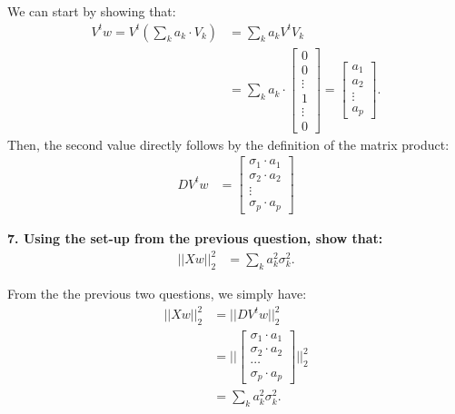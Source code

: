\documentclass[12pt,hidelinks]{article}
\numberwithin{equation}{section}
\begin{document}
\vspace*{12pt}

We can start by showing that:
\begin{align}
V^t w = V^t (\sum_k a_k \cdot V_k) &= \sum_k a_k V^t V_k \\
&= \sum_k a_k \cdot \begin{bmatrix} 0 \\ 0 \\ \vdots \\ 1 \\ \vdots \\ 0 \end{bmatrix}
= \begin{bmatrix} a_1 \\ a_2 \\ \vdots \\ a_p \end{bmatrix}.
\end{align}
Then, the second value directly follows by the definition of the matrix product:
\begin{align}
D V^t w &= \begin{bmatrix} \sigma_1 \cdot a_1 \\ \sigma_2 \cdot a_2 \\ \vdots \\ \sigma_p \cdot a_p \end{bmatrix}
\end{align}

\textbf{7. Using the set-up from the previous question, show that:}
\begin{align}
|| X w ||_2^2 &= \sum_k a_k^2 \sigma_k^2.
\end{align}

\vspace*{12pt}

From the the previous two questions, we simply have:
\begin{align}
|| X w ||_2^2 &= || D V^t w ||_2^2 \\
&= || \begin{bmatrix} \sigma_1 \cdot a_1 \\ \sigma_2 \cdot a_2 \\ \cdots \\ \sigma_p \cdot a_p \end{bmatrix} ||_2^2 \\
&= \sum_k a_k^2 \sigma_k^2.
\end{align}

\vspace*{12pt}
\end{document}
